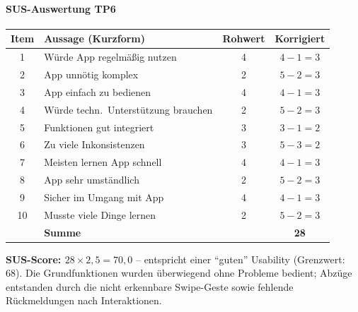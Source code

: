 \documentclass{article}
\begin{document}
\paragraph{SUS-Auswertung TP6}

\begin{tabular}{@{}clcc@{}}
  \hline
  \textbf{Item} & \textbf{Aussage (Kurzform)} & \textbf{Rohwert} & \textbf{Korrigiert} \\
  \hline
  1  & Würde App regelmäßig nutzen          & 4 & $4-1=3$ \\
  2  & App unnötig komplex                  & 2 & $5-2=3$ \\
  3  & App einfach zu bedienen              & 4 & $4-1=3$ \\
  4  & Würde techn.\ Unterstützung brauchen & 2 & $5-2=3$ \\
  5  & Funktionen gut integriert            & 3 & $3-1=2$ \\
  6  & Zu viele Inkonsistenzen              & 3 & $5-3=2$ \\
  7  & Meisten lernen App schnell           & 4 & $4-1=3$ \\
  8  & App sehr umständlich                 & 2 & $5-2=3$ \\
  9  & Sicher im Umgang mit App             & 4 & $4-1=3$ \\
  10 & Musste viele Dinge lernen            & 2 & $5-2=3$ \\
  \hline
     & \textbf{Summe}                       &   & \textbf{28} \\
  \hline
\end{tabular}

\medskip
\textbf{SUS-Score: $28 \times 2{,}5 = 70{,}0$} –
entspricht einer \enquote{guten} Usability (Grenzwert: 68).
Die Grundfunktionen wurden überwiegend ohne Probleme bedient;
Abzüge entstanden durch die nicht erkennbare Swipe-Geste sowie
fehlende Rückmeldungen nach Interaktionen.

\newpage
%
%
%
\end{document}
